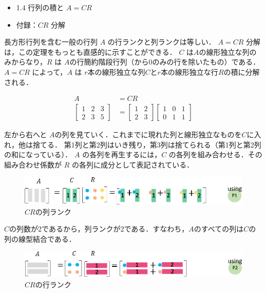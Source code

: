 \documentclass[letterpaper]{article}
\begin{document}
\begin{itemize}
  \item 1.4 行列の積と $A=CR$
  \item 付録：$CR$ 分解
\end{itemize}

長方形行列を含む一般の行列 $A$ の行ランクと列ランクは等しい．
$A=CR$ 分解は，この定理をもっとも直感的に示すことができる．
$C$ は$A$の線形独立な列のみからなり，$R$ は $A$の行簡約階段行列（から0のみの行を除いたもの）である．
$A=CR$ によって，$A$ は $r$本の線形独立な列$C$と$r$本の線形独立な行$R$の積に分解される．

\begin{equation*}
  \begin{split}
    A &= CR\\
  \begin{bmatrix}
    1 & 2 & 3 \\
    2 & 3 & 5
  \end{bmatrix}
  & =
  \begin{bmatrix}
    1 & 2 \\
    2 & 3
  \end{bmatrix}
  \begin{bmatrix}
    1 & 0 & 1 \\
    0 & 1 & 1
  \end{bmatrix}
\end{split}
\end{equation*}

左から右へと $A$の列を見ていく．これまでに現れた列と線形独立なものを$C$に入れ，他は捨てる．
第1列と第2列はいき残り，第3列は捨てられる（第1列と第2列の和になっている）．
$A$ の各列を再生するには，$C$ の各列を組み合わせる．その組み合わせ係数が $R$ の各列に成分として表記されている．

\begin{figure}[H]
  \includegraphics[keepaspectratio, width=\linewidth]{CR1-j.eps}
  \caption{$CR$の列ランク}
\end{figure}

$C$の列数が2であるから，列ランクが2である．すなわち，$A$のすべての列は$C$の列の線型結合である．

\begin{figure}[H]
  \includegraphics[keepaspectratio, width=\linewidth]{CR2-j.eps}
  \caption{$CR$の行ランク}
\end{figure}
\end{document}
